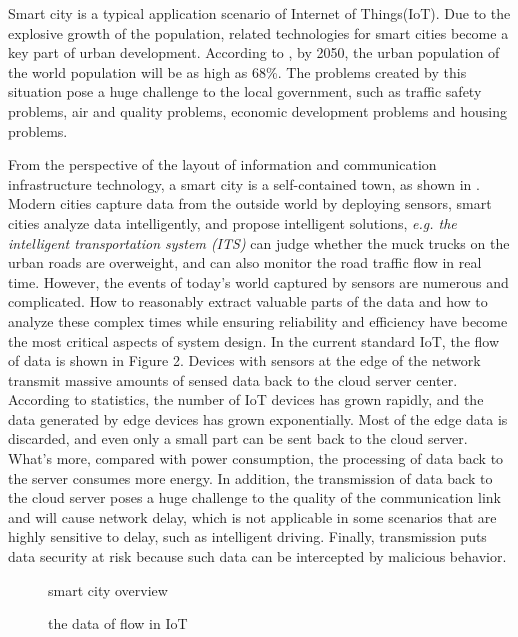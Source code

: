 \documentclass[conference]{IEEEtran}
\begin{document}
	Smart city is a typical application scenario of Internet of Things(IoT). Due to
	the explosive growth of the population, related technologies for smart cities
	become a key part of urban development. According to
	\cite{doi:10.1177/1550147719853984}, by 2050, the urban population of the world
	population will be as high as 68$\%$. The problems created by this situation
	pose a huge challenge to the local government, such as traffic safety problems,
	air and quality problems, economic development problems and housing problems.
	
	From the perspective of the layout of information and communication
	infrastructure technology, a smart city is a self-contained town\cite{article},
	as shown in \figurename. Modern cities capture data from the outside world by
	deploying sensors, smart cities analyze data intelligently, and propose
	intelligent solutions,\textit{ e.g. the intelligent transportation system
		(ITS)}\cite{8824092} can judge whether the muck trucks on the urban roads are
	overweight, and can also monitor the road traffic flow in real time. However,
	the events of today's world captured by sensors are numerous and complicated.
	How to reasonably extract valuable parts of the data and how to analyze these
	complex times while ensuring reliability and efficiency have become the most
	critical aspects of system design. In the current standard IoT, the flow of data
	is shown in Figure 2. Devices with sensors at the edge of the network transmit
	massive amounts of sensed data back to the cloud server center. According to
	statistics, the number of IoT devices has grown rapidly, and the data generated
	by edge devices has grown exponentially. Most of the edge data is discarded, and
	even only a small part can be sent back to the cloud server. What's more, compared with power consumption, the processing of data back to the server consumes more energy. In addition, the
	transmission of data back to the cloud server poses a huge challenge to the
	quality of the communication link and will cause network delay, which is not
	applicable in some scenarios that are highly sensitive to delay, such as
	intelligent driving. Finally, transmission puts data security at risk because
	such data can be intercepted by malicious behavior.
	\begin{center}
		\begin{figure}[h]
			\caption{smart city overview}
		\end{figure}
	\end{center}
	\begin{center}
		\begin{figure}[h]
			\caption{the data of flow in IoT}
		\end{figure}
	\end{center}
\end{document}
